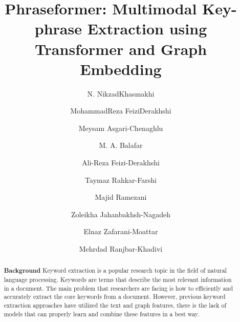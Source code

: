 \documentclass[review,3p]{elsarticle}
\begin{document}
\begin{frontmatter}

\title{Phraseformer: Multimodal Key-phrase Extraction using Transformer and Graph Embedding}



\author[mymainaddress]{N. Nikzad\textendash Khasmakhi }
\author[mymainaddress]{Mohammad\textendash Reza Feizi\textendash Derakhshi }
\author[mymainaddress]{Meysam Asgari-Chenaghlu}
\author[UT]{M. A. Balafar}
\author[mymainaddress]{Ali-Reza Feizi-Derakhshi}
\author[mymainaddress,mysecondaddress]{Taymaz Rahkar-Farshi}
\author[mymainaddress]{Majid Ramezani}
\author[mymainaddress,myfifthaddress]{Zoleikha Jahanbakhsh-Nagadeh}
\author[mymainaddress,mythirdaddress]{Elnaz Zafarani-Moattar}
\author[mymainaddress,myfourthaddress]{Mehrdad Ranjbar-Khadivi}



\address[mymainaddress]{Computerized Intelligence Systems Laboratory, Department of Computer Engineering, University of Tabriz, Tabriz, Iran}
\address[UT]{Department of Computer Engineering, University of Tabriz, Tabriz, Iran}
\address[mysecondaddress]{Department of Software Engineering, Ayvansaray University, Istanbul, Turkey}
\address[myfifthaddress]{Department of Computer Engineering, Naghadeh Branch, Islamic Azad University, Naghadeh, Iran}
\address[mythirdaddress]{Department of Computer Engineering, Tabriz Branch, Islamic Azad University, Tabriz, Iran}
\address[myfourthaddress]{Department of Computer Engineering, Shabestar Branch, Islamic Azad University, Shabestar, Iran.}


\begin{abstract}

\textbf{Background}
Keyword extraction is a popular research topic in the field of natural language processing.  Keywords are terms that describe the most relevant information in a document. The main problem that researchers are facing is how to efficiently and accurately extract the core keywords from a document.  However, previous keyword extraction approaches have utilized the text and graph features, there is the lack of models that can properly learn and combine these features in a best way.


\end{abstract}
\end{frontmatter}
\end{document}
